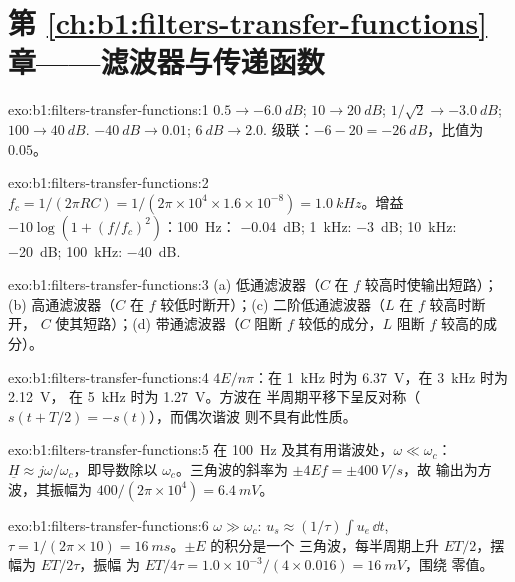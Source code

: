 \section*{第 \ref{ch:b1:filters-transfer-functions} 章——滤波器与传递函数}

\begin{solution}{exo:b1:filters-transfer-functions:1}
$0.5 \to \qty{-6.0}{dB}$; $10 \to \qty{20}{dB}$; $1/\sqrt2 \to \qty{-3.0}{dB}$;
$100 \to \qty{40}{dB}$. $\qty{-40}{dB} \to 0.01$; $\qty{+6}{dB} \to 2.0$.
级联：$-6 - 20 = \qty{-26}{dB}$，比值为 $0.05$。
\end{solution}

\begin{solution}{exo:b1:filters-transfer-functions:2}
$f_c = 1/(2\pi RC) = 1/(2\pi \times 10^4 \times 1.6\times10^{-8}) =
\qty{1.0}{kHz}$。增益 $-10\log(1 + (f/f_c)^2)$：\qty{100}{Hz}：
\qty{-0.04}{dB}; \qty{1}{kHz}: \qty{-3}{dB}; \qty{10}{kHz}: \qty{-20}{dB};
\qty{100}{kHz}: \qty{-40}{dB}.
\end{solution}

\begin{solution}{exo:b1:filters-transfer-functions:3}
(a) 低通滤波器（$C$ 在 $f$ 较高时使输出短路）；(b) 高通滤波器（$C$
在 $f$ 较低时断开）；(c) 二阶低通滤波器（$L$ 在 $f$ 较高时断开，
$C$ 使其短路）；(d) 带通滤波器（$C$ 阻断 $f$ 较低的成分，$L$ 阻断 $f$ 较高的成分）。
\end{solution}

\begin{solution}{exo:b1:filters-transfer-functions:4}
$4E/n\pi$：在 \qty{1}{kHz} 时为 \qty{6.37}{V}，在 \qty{3}{kHz} 时为 \qty{2.12}{V}，
在 \qty{5}{kHz} 时为 \qty{1.27}{V}。方波在
半周期平移下呈反对称（$s(t + T/2) = -s(t)$），而偶次谐波
则不具有此性质。
\end{solution}

\begin{solution}{exo:b1:filters-transfer-functions:5}
在 \qty{100}{Hz} 及其有用谐波处，$\omega \ll \omega_c$：
$\underline H \approx j\omega/\omega_c$，即导数除以
$\omega_c$。三角波的斜率为 $\pm 4Ef = \pm\qty{400}{V/s}$，故
输出为方波，其振幅为 $400/(2\pi \times 10^4) =
\qty{6.4}{mV}$。
\end{solution}

\begin{solution}{exo:b1:filters-transfer-functions:6}
$\omega \gg \omega_c$: $u_s \approx (1/\tau)\int u_e\,\dd t$, $\tau =
1/(2\pi \times 10) = \qty{16}{ms}$。$\pm E$ 的积分是一个
三角波，每半周期上升 $ET/2$，摆幅为 $ET/2\tau$，振幅
为 $ET/4\tau = 1.0 \times 10^{-3}/(4 \times 0.016) = \qty{16}{mV}$，围绕
零值。
\end{solution}

